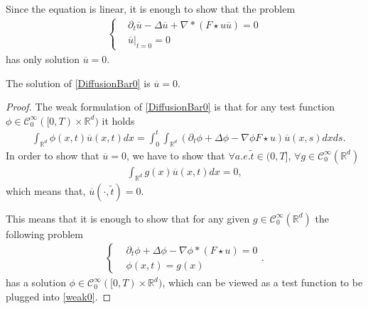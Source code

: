 Since the equation is linear, it is enough to show that the problem
\begin{align}\label{DiffusionBar0}
\begin{cases}
&\partial_t \overline{u}  - \Delta \overline{u }  + \nabla * (F\star u\overline{u } ) = 0\\
&\overline{u } \rvert_{t=0}  = 0
\end{cases}
\end{align}
has only solution $\overline{u}=0$.
\begin{theorem}
	The solution of \autoref{DiffusionBar0} is $\overline{u}=0$.
\end{theorem}

\begin{proof}
The weak formulation of \autoref{DiffusionBar0} is that for any test function  $\phi  \in  \mathcal{C}_0^{\infty}([0,T)\times \mathbb{R}^{d} )$ it holds
\begin{align}\label{weak0}
  &\int_{\mathbb{R}^{d} } \phi(x,t)\overline{u}(x,t) dx = \int_0^{t}\int_{\mathbb{R}^{d} }  (\partial_t \phi  + \Delta \phi  - \nabla \phi F \star u) \overline{u}(x,s)dxds 
.\end{align}
In order to show that $\overline{u}=0$, we have to show that $\forall a.e. \tilde t\in (0,T]$, $\forall  g \in  \mathcal{C}_0^{\infty}(\mathbb{R}^{d} ) $
\begin{align*}
\int_{\mathbb{R}^{d} }g(x) \overline{u}(x,t)dx = 0
,\end{align*}
which means that, $\overline{u}(\cdot,\tilde t)=0$.

This means that it is enough to show that for any given $g\in  \mathcal{C}_0^{\infty}(\mathbb{R}^{d} ) $ the following problem 
\begin{align*}
  \begin{cases}
    &\partial_t \phi  + \Delta  \phi  - \nabla \phi *(F \star u) = 0\\
    &\phi(x,t) = g(x)
  \end{cases}
.\end{align*}has a solution $\phi \in  \mathcal{C}_0^{\infty}([0,T)\times \mathbb{R}^{d} )$, which can be viewed as a test function to be plugged into \autoref{weak0}.


\end{proof}
